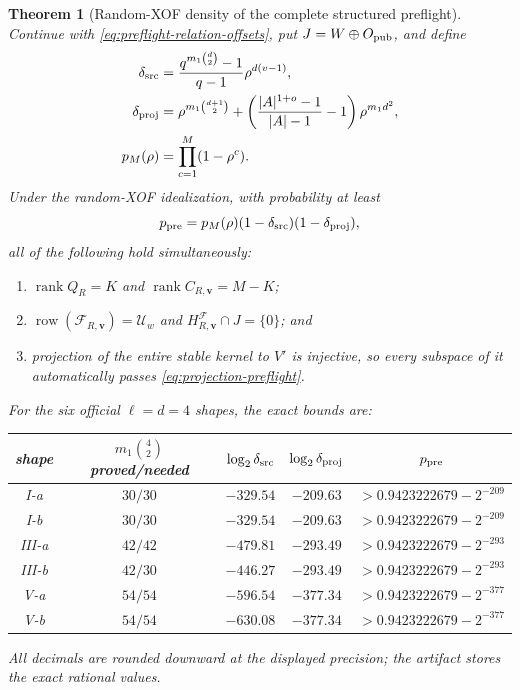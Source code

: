 \documentclass[11pt]{article}
\newtheorem{theorem}{Theorem}
\newcommand{\rank}{\operatorname{rank}}
\begin{document}
\begin{theorem}[Random-XOF density of the complete structured preflight]
\label{thm:structured-preflight-density}
Continue with \eqref{eq:preflight-relation-offsets}, put
$J=W\oplus O_{\rm pub}$, and define
\begin{align}
 \delta_{\rm src}
 &=\frac{q^{m_1\binom d2}-1}{q-1}\rho^{d(v-1)},
 \label{eq:delta-src}\\
 \delta_{\rm proj}
 &=\rho^{m_1\binom{d+1}{2}}
   +\left(\frac{|A|^{1+o}-1}{|A|-1}-1\right)\rho^{m_1d^2},
 \label{eq:delta-proj}\\
 p_M(\rho)&=\prod_{c=1}^{M}(1-\rho^c).
 \label{eq:outer-full-rank-prob}
\end{align}
Under the random-XOF idealization, with probability at least
\begin{equation}\label{eq:complete-preflight-prob}
 p_{\rm pre}=p_M(\rho)(1-\delta_{\rm src})(1-\delta_{\rm proj}),
\end{equation}
all of the following hold simultaneously:
\begin{enumerate}[label=(\roman*)]
\item $\rank Q_R=K$ and $\rank C_{R,\mathbf v}=M-K$;
\item $\operatorname{row}(\mathcal F_{R,\mathbf v})=\mathcal U_w$ and
      $H^{\mathcal F}_{R,\mathbf v}\cap J=\{0\}$; and
\item projection of the entire stable kernel to $V'$ is injective, so every
      subspace of it automatically passes \eqref{eq:projection-preflight}.
\end{enumerate}
For the six official $\ell=d=4$ shapes, the exact bounds are:
\begin{center}
\begin{tabular}{@{}c c c c c@{}}
\toprule
shape & $m_1\binom42$ proved/needed & $\log_2\delta_{\rm src}$ &
$\log_2\delta_{\rm proj}$ & $p_{\rm pre}$\\
\midrule
I-a   & $30/30$ & $-329.54$ & $-209.63$ & $>0.9423222679-2^{-209}$\\
I-b   & $30/30$ & $-329.54$ & $-209.63$ & $>0.9423222679-2^{-209}$\\
III-a & $42/42$ & $-479.81$ & $-293.49$ & $>0.9423222679-2^{-293}$\\
III-b & $42/30$ & $-446.27$ & $-293.49$ & $>0.9423222679-2^{-293}$\\
V-a   & $54/54$ & $-596.54$ & $-377.34$ & $>0.9423222679-2^{-377}$\\
V-b   & $54/54$ & $-630.08$ & $-377.34$ & $>0.9423222679-2^{-377}$\\
\bottomrule
\end{tabular}
\end{center}
All decimals are rounded downward at the displayed precision; the artifact
stores the exact rational values.
\end{theorem}
\end{document}
